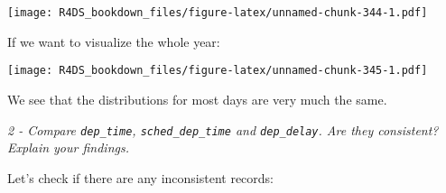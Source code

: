 \documentclass[]{article}
\newenvironment{Shaded}{\begin{snugshade}}{\end{snugshade}}
\newcommand{\KeywordTok}[1]{\textcolor[rgb]{0.13,0.29,0.53}{\textbf{#1}}}
\newcommand{\DataTypeTok}[1]{\textcolor[rgb]{0.13,0.29,0.53}{#1}}
\newcommand{\DecValTok}[1]{\textcolor[rgb]{0.00,0.00,0.81}{#1}}
\newcommand{\StringTok}[1]{\textcolor[rgb]{0.31,0.60,0.02}{#1}}
\newcommand{\OperatorTok}[1]{\textcolor[rgb]{0.81,0.36,0.00}{\textbf{#1}}}
\newcommand{\NormalTok}[1]{#1}
\theoremstyle{definition}
\theoremstyle{definition}
\theoremstyle{definition}
\theoremstyle{remark}
\begin{document}
\texttt{[image: R4DS\_bookdown\_files/figure-latex/unnamed-chunk-344-1.pdf]}

If we want to visualize the whole year:

\begin{Shaded}
\end{Shaded}

\texttt{[image: R4DS\_bookdown\_files/figure-latex/unnamed-chunk-345-1.pdf]}

We see that the distributions for most days are very much the same.

\emph{2 - Compare \texttt{dep\_time}, \texttt{sched\_dep\_time} and
\texttt{dep\_delay}. Are they consistent? Explain your findings.}

Let's check if there are any inconsistent records:

\begin{Shaded}
\end{Shaded}
\end{document}
